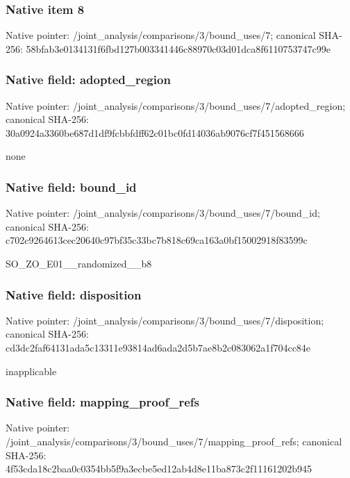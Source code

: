 \documentclass[10pt,a4paper]{article}
\begin{document}
\subsubsection{Native item 8}
Native pointer: /joint\_\allowbreak{}analysis/comparisons/3/bound\_\allowbreak{}uses/7; canonical SHA-256: 58bfab3e0134131f6fbd127b003341446c88970c03d01dca8f6110753747c99e

\subsubsection{Native field: adopted\_\allowbreak{}region}
Native pointer: /joint\_\allowbreak{}analysis/comparisons/3/bound\_\allowbreak{}uses/7/adopted\_\allowbreak{}region; canonical SHA-256: 30a0924a3360be687d1df9fcbbfdff62c01bc0fd14036ab9076cf7f451568666

\begingroup\raggedright\sloppy none\par\endgroup

\subsubsection{Native field: bound\_\allowbreak{}id}
Native pointer: /joint\_\allowbreak{}analysis/comparisons/3/bound\_\allowbreak{}uses/7/bound\_\allowbreak{}id; canonical SHA-256: c702c9264613cec20640c97bf35c33bc7b818c69ca163a0bf15002918f83599c

\begingroup\raggedright\sloppy SO\_\allowbreak{}ZO\_\allowbreak{}E01\_\allowbreak{}\_\allowbreak{}randomized\_\allowbreak{}\_\allowbreak{}b8\par\endgroup

\subsubsection{Native field: disposition}
Native pointer: /joint\_\allowbreak{}analysis/comparisons/3/bound\_\allowbreak{}uses/7/disposition; canonical SHA-256: cd3dc2faf64131ada5c13311e93814ad6ada2d5b7ae8b2c083062a1f704cc84e

\begingroup\raggedright\sloppy inapplicable\par\endgroup

\subsubsection{Native field: mapping\_\allowbreak{}proof\_\allowbreak{}refs}
Native pointer: /joint\_\allowbreak{}analysis/comparisons/3/bound\_\allowbreak{}uses/7/mapping\_\allowbreak{}proof\_\allowbreak{}refs; canonical SHA-256: 4f53cda18c2baa0c0354bb5f9a3ecbe5ed12ab4d8e11ba873c2f11161202b945
\end{document}
